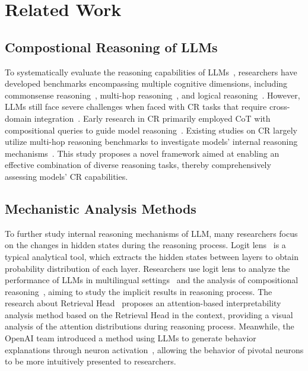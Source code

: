 \section{Related Work}
\subsection{Compostional Reasoning of LLMs}
To systematically evaluate the reasoning capabilities of LLMs~\cite{map_neo,llama3,qwen25,execrepobench,codearena,mdeval}, researchers have developed benchmarks encompassing multiple cognitive dimensions, including commonsense reasoning~\citep{ponti-etal-2020-xcopa,singh2021com2sense,onoe2021creak}, multi-hop reasoning~\citep{ho2020constructing, shi2022stepgame, trivedi2022musique}, and logical reasoning~\citep{saparov2023language,han2022folio,masry2022chartqa}. However, LLMs still face severe challenges when faced with CR tasks that require cross-domain integration~\citep{dziri2024faith, press2022measuring}. Early research in CR primarily employed CoT with compositional queries to guide model reasoning~\citep{zhou2022least, drozdov2022compositional}. Existing studies on CR largely utilize multi-hop reasoning benchmarks to investigate models' internal reasoning mechanisms~\citep{sakarvadia2023memory, ghandeharioun2024patchscope, li2024understanding}. This study proposes a novel framework aimed at enabling an effective combination of diverse reasoning tasks, thereby comprehensively assessing models' CR capabilities.

\subsection{Mechanistic Analysis Methods}
To further study internal reasoning mechanisms of LLM, many researchers focus on the changes in hidden states during the reasoning process. Logit lens~\citep{logitlens} is a typical analytical tool, which extracts the hidden states between layers to obtain probability distribution of each layer. Researchers use logit lens to analyze the performance of LLMs in multilingual settings~\citep{LanguageMoel} and the analysis of compositional reasoning~\citep{CompositionalReasoning}, aiming to study the implicit results in reasoning process. The research about Retrieval Head~\citep{Wu2024RetrievalHM} proposes an attention-based interpretability analysis method based on the Retrieval Head in the context, providing a visual analysis of the attention distributions during reasoning process. Meanwhile, the OpenAI team introduced a method using LLMs to generate behavior explanations through neuron activation~\citep{bills2023language}, allowing the behavior of pivotal neurons to be more intuitively presented to researchers.